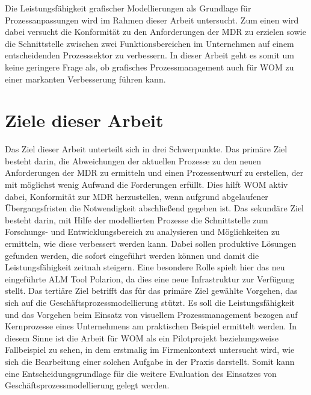 \documentclass[a4paper,12pt]{report}
\begin{document}
Die Leistungsfähigkeit grafischer Modellierungen als Grundlage für Prozessanpassungen wird im Rahmen dieser Arbeit untersucht. Zum einen wird dabei versucht die Konformität zu den Anforderungen der MDR zu erzielen sowie die Schnittstelle zwischen zwei Funktionsbereichen im Unternehmen auf einem entscheidenden Prozesssektor zu verbessern. In dieser Arbeit geht es somit um keine geringere Frage als, ob grafisches Prozessmanagement auch für WOM zu einer markanten Verbesserung führen kann.

\section{Ziele dieser Arbeit}
Das Ziel dieser Arbeit unterteilt sich in drei Schwerpunkte. Das primäre Ziel besteht darin, die Abweichungen der aktuellen Prozesse zu den neuen Anforderungen der MDR zu ermitteln und einen Prozessentwurf zu erstellen, der mit möglichst wenig Aufwand die Forderungen erfüllt. Dies hilft WOM aktiv dabei, Konformität zur MDR herzustellen, wenn aufgrund abgelaufener Übergangsfristen die Notwendigkeit abschließend gegeben ist. Das sekundäre Ziel besteht darin, mit Hilfe der modellierten Prozesse die Schnittstelle zum Forschungs- und Entwicklungsbereich zu analysieren und Möglichkeiten zu ermitteln, wie diese verbessert werden kann. Dabei sollen produktive Lösungen gefunden werden, die sofort eingeführt werden können und damit die Leistungsfähigkeit zeitnah steigern. Eine besondere Rolle spielt hier das neu eingeführte \ac{ALM} Tool Polarion, da dies eine neue Infrastruktur zur Verfügung stellt. Das tertiäre Ziel betrifft das für das primäre Ziel gewählte Vorgehen, das sich auf die Geschäftsprozessmodellierung stützt. Es soll die Leistungsfähigkeit und das Vorgehen beim Einsatz von visuellem Prozessmanagement bezogen auf Kernprozesse eines Unternehmens am praktischen Beispiel ermittelt werden. In diesem Sinne ist die Arbeit für WOM als ein Pilotprojekt beziehungsweise Fallbeispiel zu sehen, in dem erstmalig im Firmenkontext untersucht wird, wie sich die Bearbeitung einer solchen Aufgabe in der Praxis darstellt. Somit kann eine Entscheidungsgrundlage für die weitere Evaluation des Einsatzes von Geschäftsprozessmodellierung gelegt werden.
\end{document}
